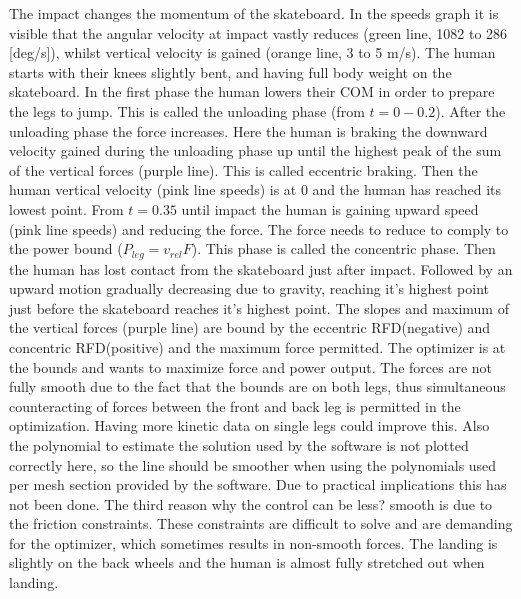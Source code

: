 \documentclass[default,iicol]{sn-jnl}
\begin{document}
The impact changes the momentum of the skateboard. In the speeds graph it is visible that the angular velocity at impact vastly reduces (green line, 1082 to 286 [deg/s]), whilst vertical velocity is gained (orange line, 3 to 5 m/s).
The human starts with their knees slightly bent, and having full body weight on the skateboard. In the first phase the human lowers their COM in order to prepare the legs to jump. This is called the unloading phase (from $t=0 - 0.2$). After the unloading phase the force increases. Here the human is braking the downward velocity gained during the unloading phase up until the highest peak of the sum of the vertical forces (purple line). This is called eccentric braking. Then the human vertical velocity (pink line speeds) is at 0 and the human has reached its lowest point. From $t=0.35$ until impact the human is gaining upward speed  (pink line speeds) and reducing the force. The force needs to reduce to comply to the power bound ($P_{leg} = v_{rel} F$). This phase is called the concentric phase. Then the human has lost contact from the skateboard just after impact. Followed by an upward motion gradually decreasing due to gravity, reaching it's highest point just before the skateboard reaches it's highest point. The slopes and maximum of the vertical forces (purple line) are bound by the eccentric RFD(negative) and concentric RFD(positive) and the maximum force permitted. The optimizer is at the bounds and wants to maximize force and power output. The forces are not fully smooth due to the fact that the bounds are on both legs, thus simultaneous counteracting of forces between the front and back leg is permitted in the optimization. Having more kinetic data on single legs could improve this. Also the polynomial to estimate the solution used by the software is not plotted correctly here, so the line should be smoother when using the polynomials used per mesh section provided by the software. Due to practical implications this has not been done. The third reason why the control can be less? smooth is due to the friction constraints. These constraints are difficult to solve and are demanding for the optimizer, which sometimes results in non-smooth forces.
The landing is slightly on the back wheels and the human is almost fully stretched out when landing.
\end{document}
